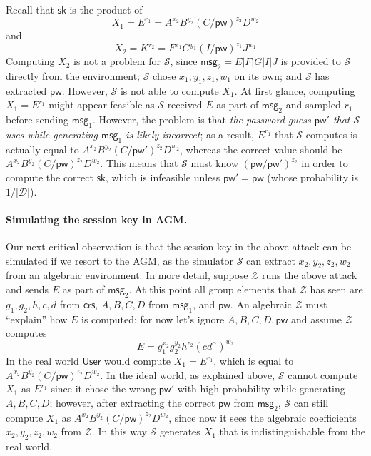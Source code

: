 \documentclass[10pt,a4paper]{article}
\newcommand{\simulator}{\mathcal{S}}
\newcommand{\env}{\mathcal{Z}}
\newcommand{\user}{\mathsf{User}}
\newcommand{\sk}{\mathsf{sk}}
\newcommand{\pw}{\mathsf{pw}}
\newcommand{\crs}{\mathsf{crs}}
\newcommand{\msg}[1]{\mathsf{msg}_{#1}}
\begin{document}
Recall that $\sk$ is the product of
\[
X_1 = E^{r_1} = A^{x_2}B^{y_2}(C/\pw)^{z_2}D^{w_2}
\]
and
\[
X_2 = K^{r_2} = F^{x_1}G^{y_1}(I/\pw)^{z_1}J^{w_1}
\]
Computing $X_2$ is not a problem for $\simulator$, since $\msg{2} = E|F|G|I|J$ is provided to $\simulator$ directly from the environment; $\simulator$ chose $x_1, y_1, z_1, w_1$ on its own; and $\simulator$ has extracted $\pw$. However, $\simulator$ is not able to compute $X_1$. At first glance, computing $X_1 = E^{r_1}$ might appear feasible as $\simulator$ received $E$ as part of $\msg{2}$ and sampled $r_1$ before sending $\msg{1}$. However, the problem is that \emph{the password guess $\pw'$ that $\simulator$ uses while generating $\msg{1}$ is likely incorrect}; as a result, $E^{r_1}$ that $\simulator$ computes is actually equal to $A^{x_2}B^{y_2}(C/\pw')^{z_2}D^{w_2}$, whereas the correct value should be $A^{x_2}B^{y_2}(C/\pw)^{z_2}D^{w_2}$. This means that $\simulator$ must know $(\pw/\pw')^{z_2}$ in order to compute the correct $\sk$, which is infeasible unless $\pw'=\pw$ (whose probability is $1/\mathcal{|D|}$).

\paragraph{Simulating the session key in AGM.}

Our next critical observation is that the session key in the above attack can be simulated if we resort to the AGM, as the simulator $\simulator$ can extract $x_2, y_2, z_2, w_2$ from an algebraic environment. In more detail, suppose $\env$ runs the above attack and sends $E$ as part of $\msg{2}$. At this point all group elements that $\env$ has seen are $g_1,g_2,h,c,d$ from $\crs$, $A,B,C,D$ from $\msg{1}$, and $\pw$. An algebraic $\env$ must ``explain'' how $E$ is computed; for now let's ignore $A,B,C,D,\pw$ and assume $\env$ computes
\[
E = g_1^{x_2}g_2^{y_2}h^{z_2}(cd^\alpha)^{w_2}
\]
In the real world $\user$ would compute $X_1 = E^{r_1}$, which is equal to $A^{x_2}B^{y_2}(C/\pw)^{z_2}D^{w_2}$. In the ideal world, as explained above, $\simulator$ cannot compute $X_1$ as $E^{r_1}$ since it chose the wrong $\pw'$ with high probability while generating $A,B,C,D$; however, after extracting the correct $\pw$ from $\msg{2}$, $\simulator$ can still compute $X_1$ as $A^{x_2}B^{y_2}(C/\pw)^{z_2}D^{w_2}$, since now it sees the algebraic coefficients $x_2,y_2,z_2,w_2$ from $\env$. In this way $\simulator$ generates $X_1$ that is indistinguishable from the real world.
\end{document}
